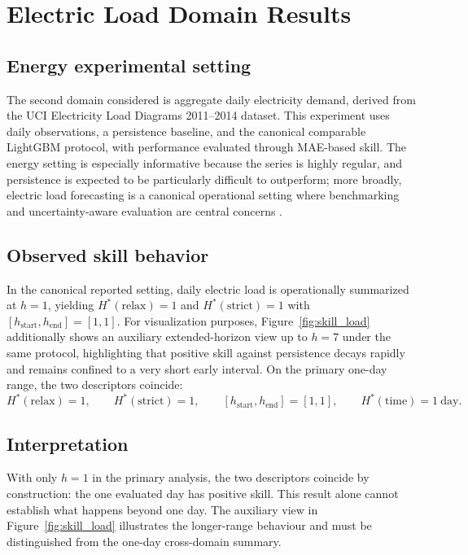 \documentclass[pdflatex]{sn-jnl}
\begin{document}
\section{Electric Load Domain Results}

\subsection{Energy experimental setting}

The second domain considered is aggregate daily electricity demand, derived from the UCI Electricity Load Diagrams 2011--2014 dataset. This experiment uses daily observations, a persistence baseline, and the canonical comparable LightGBM protocol, with performance evaluated through MAE-based skill. The energy setting is especially informative because the series is highly regular, and persistence is expected to be particularly difficult to outperform; more broadly, electric load forecasting is a canonical operational setting where benchmarking and uncertainty-aware evaluation are central concerns \citep{hong2016}.

\subsection{Observed skill behavior}
In the canonical reported setting, daily electric load is operationally summarized at $h = 1$, yielding $H^*(\mathrm{relax}) = 1$ and $H^*(\mathrm{strict}) = 1$ with $[h_{\mathrm{start}},h_{\mathrm{end}}] = [1, 1]$. For visualization purposes, Figure~\ref{fig:skill_load} additionally shows an auxiliary extended-horizon view up to $h=7$ under the same protocol, highlighting that positive skill against persistence decays rapidly and remains confined to a very short early interval.
On the primary one-day range, the two descriptors coincide:
\begin{equation}
H^*(\mathrm{relax}) = 1, \qquad H^*(\mathrm{strict}) = 1, \qquad [h_{\mathrm{start}}, h_{\mathrm{end}}] = [1,1], \qquad H^*(\mathrm{time}) = 1\ \mathrm{day}.
\end{equation}

\subsection{Interpretation}
With only $h=1$ in the primary analysis, the two descriptors coincide by
construction: the one evaluated day has positive skill. This result alone
cannot establish what happens beyond one day. The auxiliary view in
Figure~\ref{fig:skill_load} illustrates the longer-range behaviour and must
be distinguished from the one-day cross-domain summary.
\end{document}

